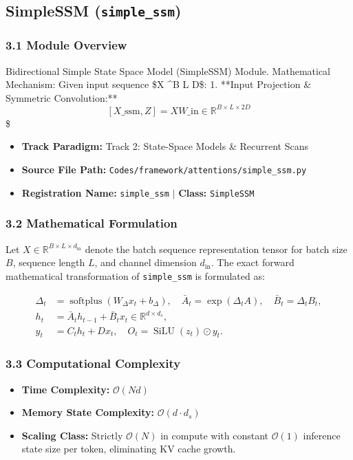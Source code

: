 \subsection{SimpleSSM (\texttt{simple\_ssm})}
\label{sec:app_module_simple_ssm}

\subsubsection*{3.1 Module Overview}
Bidirectional Simple State Space Model (SimpleSSM) Module.  Mathematical Mechanism:     Given input sequence \$X \in {}^{B \times L \times D}\$:     1. **Input Projection \& Symmetric Convolution:**        $$[X\_{\text{ssm}}, Z] = X W\_{\text{in}} \in \mathbb{R}^{B \times L \times 2 D}$$        \$
\begin{itemize}
    \item \textbf{Track Paradigm:} Track 2: State-Space Models & Recurrent Scans
    \item \textbf{Source File Path:} \texttt{Codes/framework/attentions/simple\_ssm.py}
    \item \textbf{Registration Name:} \texttt{simple\_ssm} $\mid$ \textbf{Class:} \texttt{SimpleSSM}
\end{itemize}

\subsubsection*{3.2 Mathematical Formulation}
Let $X \in \mathbb{R}^{B \times L \times d_{\text{in}}}$ denote the batch sequence representation tensor for batch size $B$, sequence length $L$, and channel dimension $d_{\text{in}}$. The exact forward mathematical transformation of \texttt{simple\_ssm} is formulated as:

\begin{align}
\Delta_t &= \operatorname{softplus}(W_\Delta x_t + b_\Delta), \quad \bar{A}_t = \exp(\Delta_t A), \quad \bar{B}_t = \Delta_t B_t, \\
h_t &= \bar{A}_t h_{t-1} + \bar{B}_t x_t \in \mathbb{R}^{d \times d_s}, \\
y_t &= C_t h_t + D x_t, \quad O_t = \operatorname{SiLU}(z_t) \odot y_t.
\end{align}


\subsubsection*{3.3 Computational Complexity}
\begin{itemize}
    \item \textbf{Time Complexity:} $\mathcal{O}(N d)$
    \item \textbf{Memory State Complexity:} $\mathcal{O}(d \cdot d_s)$
    \item \textbf{Scaling Class:} Strictly $\mathcal{O}(N)$ in compute with constant $\mathcal{O}(1)$ inference state size per token, eliminating KV cache growth.
\end{itemize}

